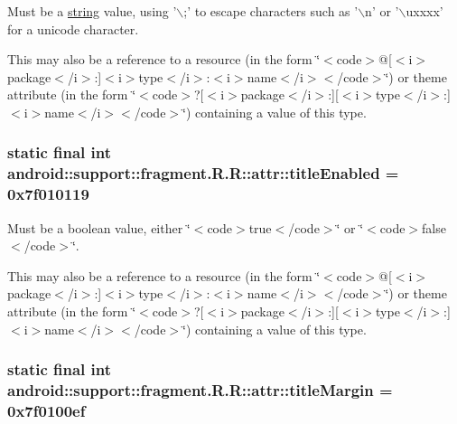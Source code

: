 Must be a \hyperlink{classandroid_1_1support_1_1fragment_1_1_r_1_1string}{string} value, using '$\backslash$;' to escape characters such as '$\backslash$n' or '$\backslash$uxxxx' for a unicode character. 

This may also be a reference to a resource (in the form \char`\"{}$<$code$>$@\mbox{[}$<$i$>$package$<$/i$>$:\mbox{]}$<$i$>$type$<$/i$>$:$<$i$>$name$<$/i$>$$<$/code$>$\char`\"{}) or theme attribute (in the form \char`\"{}$<$code$>$?\mbox{[}$<$i$>$package$<$/i$>$:\mbox{]}\mbox{[}$<$i$>$type$<$/i$>$:\mbox{]}$<$i$>$name$<$/i$>$$<$/code$>$\char`\"{}) containing a value of this type. \hypertarget{classandroid_1_1support_1_1fragment_1_1_r_1_1attr_59035ce205dbacf1265646d37aa42055}{
\subsubsection[{titleEnabled}]{\setlength{\rightskip}{0pt plus 5cm}static final int android::support::fragment.R.R::attr::titleEnabled = 0x7f010119}}
\label{classandroid_1_1support_1_1fragment_1_1_r_1_1attr_59035ce205dbacf1265646d37aa42055}


Must be a boolean value, either \char`\"{}$<$code$>$true$<$/code$>$\char`\"{} or \char`\"{}$<$code$>$false$<$/code$>$\char`\"{}. 

This may also be a reference to a resource (in the form \char`\"{}$<$code$>$@\mbox{[}$<$i$>$package$<$/i$>$:\mbox{]}$<$i$>$type$<$/i$>$:$<$i$>$name$<$/i$>$$<$/code$>$\char`\"{}) or theme attribute (in the form \char`\"{}$<$code$>$?\mbox{[}$<$i$>$package$<$/i$>$:\mbox{]}\mbox{[}$<$i$>$type$<$/i$>$:\mbox{]}$<$i$>$name$<$/i$>$$<$/code$>$\char`\"{}) containing a value of this type. \hypertarget{classandroid_1_1support_1_1fragment_1_1_r_1_1attr_a21d87784a7eaeb6c26b96eda7b2aecd}{
\subsubsection[{titleMargin}]{\setlength{\rightskip}{0pt plus 5cm}static final int android::support::fragment.R.R::attr::titleMargin = 0x7f0100ef}}
\label{classandroid_1_1support_1_1fragment_1_1_r_1_1attr_a21d87784a7eaeb6c26b96eda7b2aecd}


